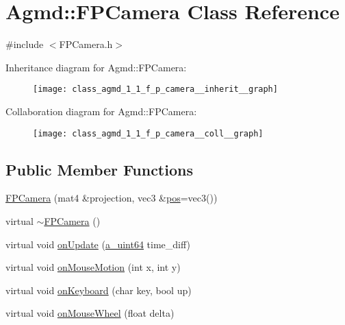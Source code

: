 \hypertarget{class_agmd_1_1_f_p_camera}{\section{Agmd\+:\+:F\+P\+Camera Class Reference}
\label{class_agmd_1_1_f_p_camera}
}


{\ttfamily \#include $<$F\+P\+Camera.\+h$>$}



Inheritance diagram for Agmd\+:\+:F\+P\+Camera\+:\nopagebreak
\begin{figure}[H]
\begin{center}
\leavevmode
\texttt{[image: class\_agmd\_1\_1\_f\_p\_camera\_\_inherit\_\_graph]}
\end{center}
\end{figure}


Collaboration diagram for Agmd\+:\+:F\+P\+Camera\+:\nopagebreak
\begin{figure}[H]
\begin{center}
\leavevmode
\texttt{[image: class\_agmd\_1\_1\_f\_p\_camera\_\_coll\_\_graph]}
\end{center}
\end{figure}
\subsection*{Public Member Functions}
\begin{DoxyCompactItemize}
\item 
\hyperlink{class_agmd_1_1_f_p_camera_acc563d13e0186798ea977df46a12206d}{F\+P\+Camera} (mat4 \&projection, vec3 \&\hyperlink{_examples_2_planet_2_app_8cpp_aa8a1c0491559faca4ebd0881575ae7f0}{pos}=vec3())
\item 
virtual \hyperlink{class_agmd_1_1_f_p_camera_a7ae7a6acdc0db1232cfd8c31d197eea4}{$\sim$\+F\+P\+Camera} ()
\item 
virtual void \hyperlink{class_agmd_1_1_f_p_camera_a1bc885fd822549508eba316b5769dba7}{on\+Update} (\hyperlink{_common_defines_8h_a6c5192ec3c55d6e5b13d2dbaa082bdea}{a\+\_\+uint64} time\+\_\+diff)
\item 
virtual void \hyperlink{class_agmd_1_1_f_p_camera_a274638b1a462deae004030eca6035e8c}{on\+Mouse\+Motion} (int x, int y)
\item 
virtual void \hyperlink{class_agmd_1_1_f_p_camera_ac651ebdc3a7c6dd40826062a833cb28f}{on\+Keyboard} (char key, bool up)
\item 
virtual void \hyperlink{class_agmd_1_1_f_p_camera_a6505ad6e0cc8886ee0e3a325970fd22e}{on\+Mouse\+Wheel} (float delta)
\end{DoxyCompactItemize}
